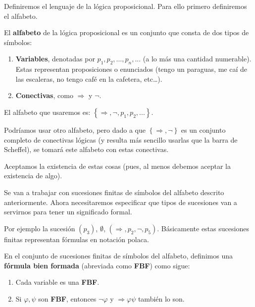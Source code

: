 \documentclass[12pt]{report}
\newcounter{it}
\theoremstyle{largebreak}
\begin{document}
    Definiremos el lenguaje de la lógica proposicional. Para ello primero definiremos el alfabeto.

    El \textbf{alfabeto} de la lógica proposicional es un conjunto que consta de dos tipos de símbolos:
    \begin{enumerate}
        \item \textbf{Variables}, denotadas por $p_1,p_2,...,p_n,...$ (a lo más una cantidad numerable). Estas representan proposiciones o enunciados (tengo un paraguas, me caí de las escaleras, no tengo café en la cafetera, etc\dots).
        \item \textbf{Conectivas}, como $\Rightarrow$ y $\neg$.
    \end{enumerate}

    El alfabeto que usaremos es: $\left\{\Rightarrow,\neg,p_1,p_2,... \right\}$.

    \begin{obs}
        Podríamos usar otro alfabeto, pero dado a que $\left\{\Rightarrow,\neg \right\}$ es un conjunto completo de conectivas lógicas (y resulta más sencillo usarlas que la barra de Scheffel), se tomará este alfabeto con estas conectivas.
    \end{obs}

    Aceptamos la existencia de estas cosas (pues, al menos debemos aceptar la existencia de algo).

    Se van a trabajar con sucesiones finitas de símbolos del alfabeto descrito anteriormente. Ahora necesitaremos especificar que tipos de sucesiones van a servirnos para tener un significado formal.

    \begin{exa}
        Por ejemplo la sucesión $(p_3)$, $\emptyset$, $(\Rightarrow, p_2,\neg,p_5)$. Básicamente estas sucesiones finitas representan fórmulas en notación polaca.
    \end{exa}

    \begin{mydef}
        En el conjunto de sucesiones finitas de símbolos del alfabeto, definimos una \textbf{fórmula bien formada} (abreviada como \textbf{FBF}) como sigue:
        \begin{enumerate}
            \item Cada variable es una \textbf{FBF}.
            \item Si $\varphi,\psi$ son \textbf{FBF}, entonces $\neg\varphi$ y $\Rightarrow\varphi\psi$ también lo son.
        \end{enumerate}
    \end{mydef}
\end{document}
